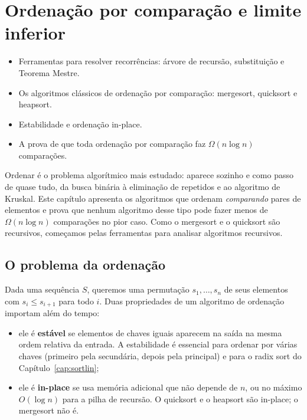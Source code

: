 \chapter{Ordenação por comparação e limite inferior}\label{cap:sortcomp}\label{sec:ordenacao}
\begin{objetivos}
\begin{itemize}
  \item Ferramentas para resolver recorrências: árvore de recursão, substituição e Teorema Mestre.
  \item Os algoritmos clássicos de ordenação por comparação: mergesort, quicksort e heapsort.
  \item Estabilidade e ordenação in-place.
  \item A prova de que toda ordenação por comparação faz $\Omega(n\log n)$ comparações.
\end{itemize}
\end{objetivos}

Ordenar é o problema algorítmico mais estudado: aparece sozinho e como passo de quase tudo, da busca binária à eliminação de repetidos e ao algoritmo de Kruskal. Este capítulo apresenta os algoritmos que ordenam \emph{comparando} pares de elementos e prova que nenhum algoritmo desse tipo pode fazer menos de $\Omega(n\log n)$ comparações no pior caso. Como o mergesort e o quicksort são recursivos, começamos pelas ferramentas para analisar algoritmos recursivos.

\section{O problema da ordenação}\label{sec:ordproblema}
Dada uma sequência $S$, queremos uma permutação $s_1,\dots,s_n$ de seus elementos com $s_i\le s_{i+1}$ para todo $i$. Duas propriedades de um algoritmo de ordenação importam além do tempo:
\begin{itemize}
  \item ele é \textbf{estável} se elementos de chaves iguais aparecem na saída na mesma ordem relativa da entrada. A estabilidade é essencial para ordenar por várias chaves (primeiro pela secundária, depois pela principal) e para o radix sort do Capítulo~\ref{cap:sortlin};
  \item ele é \textbf{in-place} se usa memória adicional que não depende de $n$, ou no máximo $O(\log n)$ para a pilha de recursão. O quicksort e o heapsort são in-place; o mergesort não é.
\end{itemize}


